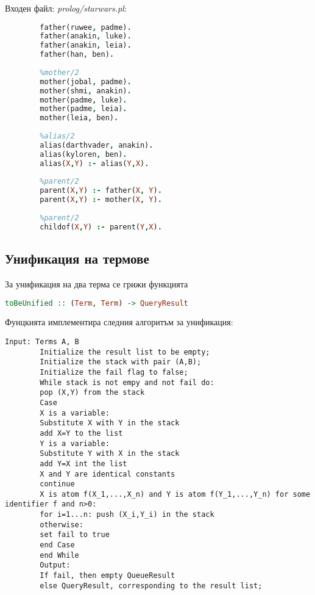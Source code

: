 \documentclass[15pt]{extarticle}
\begin{document}
	Входен файл: \emph{prolog/starwars.pl}:
	
	\begin{lstlisting}[language=Prolog,numbers=right]
		%father/2
		father(ruwee, padme).
		father(anakin, luke).
		father(anakin, leia).
		father(han, ben).
		
		%mother/2
		mother(jobal, padme).
		mother(shmi, anakin).
		mother(padme, luke).
		mother(padme, leia).
		mother(leia, ben).
		
		%alias/2
		alias(darthvader, anakin).
		alias(kyloren, ben).
		alias(X,Y) :- alias(Y,X).
		
		%parent/2
		parent(X,Y) :- father(X, Y).
		parent(X,Y) :- mother(X, Y).
		
		%parent/2
		childof(X,Y) :- parent(Y,X).
	\end{lstlisting}
	
	\subsection{Унификация на термове}
	
	За унификация на два терма се грижи функцията
	
	\begin{lstlisting}[language=haskell]
		toBeUnified :: (Term, Term) -> QueryResult
	\end{lstlisting}
	
	Фунцкията имплементира следния алгоритъм за унификация:
	
	\begin{lstlisting}[numbers=right]
		Input: Terms A, B
		Initialize the result list to be empty;
		Initialize the stack with pair (A,B);
		Initialize the fail flag to false;
		While stack is not empy and not fail do:
		pop (X,Y) from the stack
		Case
		X is a variable:
		Substitute X with Y in the stack
		add X=Y to the list
		Y is a variable:
		Substitute Y with X in the stack
		add Y=X int the list
		X and Y are identical constants 
		continue
		X is atom f(X_1,...,X_n) and Y is atom f(Y_1,...,Y_n) for some identifier f and n>0:
		for i=1...n: push (X_i,Y_i) in the stack
		otherwise:
		set fail to true
		end Case
		end While
		Output:
		If fail, then empty QueueResult
		else QueryResult, corresponding to the result list;
		
	\end{lstlisting}
\end{document}
